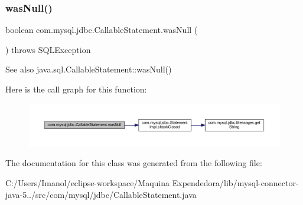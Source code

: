 \subsubsection{\texorpdfstring{was\+Null()}{wasNull()}}
{\footnotesize\ttfamily boolean com.\+mysql.\+jdbc.\+Callable\+Statement.\+was\+Null (\begin{DoxyParamCaption}{ }\end{DoxyParamCaption}) throws S\+Q\+L\+Exception}

\begin{DoxySeeAlso}{See also}
java.\+sql.\+Callable\+Statement\+::was\+Null() 
\end{DoxySeeAlso}
Here is the call graph for this function\+:\nopagebreak
\begin{figure}[H]
\begin{center}
\leavevmode
\includegraphics[width=350pt]{classcom_1_1mysql_1_1jdbc_1_1_callable_statement_affe08c14046e4beec81956a7dc445dc3_cgraph}
\end{center}
\end{figure}


The documentation for this class was generated from the following file\+:\begin{DoxyCompactItemize}
\item 
C\+:/\+Users/\+Imanol/eclipse-\/workspace/\+Maquina Expendedora/lib/mysql-\/connector-\/java-\/5../src/com/mysql/jdbc/Callable\+Statement.\+java\end{DoxyCompactItemize}
